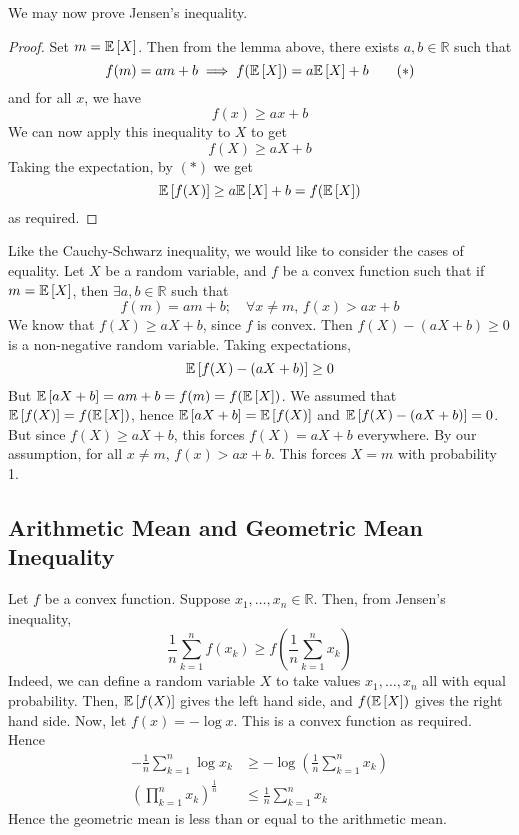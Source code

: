 \noindent We may now prove Jensen's inequality.
\begin{proof}
	Set \(m = \mathbb{E}\left[{X}\right]\).
	Then from the lemma above, there exists \(a, b \in \mathbb R\) such that
	\begin{equation}
		f(m) = am + b \implies f(\mathbb{E}\left[{X}\right]) = a\mathbb{E}\left[{X}\right] + b \tag{\(\ast\)}
	\end{equation}
	and for all \(x\), we have
	\[
		f(x) \geq ax + b
	\]
	We can now apply this inequality to \(X\) to get
	\[
		f(X) \geq aX + b
	\]
	Taking the expectation, by \((\ast)\) we get
	\[
		\mathbb{E}\left[{f(X)}\right] \geq a\mathbb{E}\left[{X}\right] + b = f(\mathbb{E}\left[{X}\right])
	\]
	as required.
\end{proof}
\noindent Like the Cauchy-Schwarz inequality, we would like to consider the cases of equality.
Let \(X\) be a random variable, and \(f\) be a convex function such that if \(m = \mathbb{E}\left[{X}\right]\), then \(\exists a, b \in \mathbb R\) such that
\[
	f(m) = am + b;\quad \forall x \neq m,\, f(x) > ax + b
\]
We know that \(f(X) \geq aX + b\), since \(f\) is convex.
Then \(f(X) - (aX+b) \geq 0\) is a non-negative random variable.
Taking expectations,
\[
	\mathbb{E}\left[{f(X) - (aX+b)}\right] \geq 0
\]
But \(\mathbb{E}\left[{aX + b}\right] = am + b = f(m) = f(\mathbb{E}\left[{X}\right])\).
We assumed that \(\mathbb{E}\left[{f(X)}\right] = f(\mathbb{E}\left[{X}\right])\), hence \(\mathbb{E}\left[{aX+b}\right] = \mathbb{E}\left[{f(X)}\right]\) and \(\mathbb{E}\left[{f(X) - (aX+b)}\right] = 0\).
But since \(f(X) \geq aX+b\), this forces \(f(X) = aX+b\) everywhere.
By our assumption, for all \(x \neq m\), \(f(x) > ax+b\).
This forces \(X=m\) with probability 1.

\subsection{Arithmetic Mean and Geometric Mean Inequality}
Let \(f\) be a convex function.
Suppose \(x_1, \dots, x_n \in \mathbb R\).
Then, from Jensen's inequality,
\[
	\frac{1}{n} \sum_{k=1}^n f(x_k) \geq f\left( \frac{1}{n} \sum_{k=1}^n x_k \right)
\]
Indeed, we can define a random variable \(X\) to take values \(x_1, \dots, x_n\) all with equal probability.
Then, \(\mathbb{E}\left[{f(X)}\right]\) gives the left hand side, and \(f(\mathbb{E}\left[{X}\right])\) gives the right hand side.
Now, let \(f(x) = -\log x\).
This is a convex function as required.
Hence
\begin{align*}
	-\frac{1}{n} \sum_{k=1}^n \log x_k             & \geq -\log\left( \frac{1}{n} \sum_{k=1}^n x_k \right) \\
	\left( \prod_{k=1}^n x_k \right)^{\frac{1}{n}} & \leq \frac{1}{n} \sum_{k=1}^n x_k
\end{align*}
Hence the geometric mean is less than or equal to the arithmetic mean.

